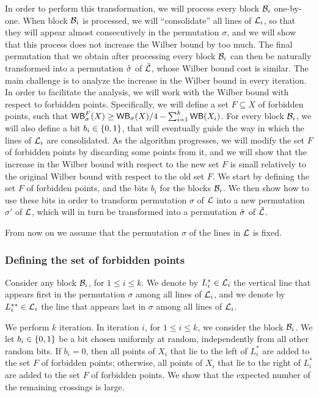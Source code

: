 \documentclass[11pt]{article}
\numberwithin{equation}{section}
\theoremstyle{definition}
\theoremstyle{plain}
\begin{document}
In order to perform this transformation, we will process every block ${\mathcal{B}}_i$ one-by-one. When block ${\mathcal{B}}_i$ is processed, we will ``consolidate'' all lines of ${\mathcal L}_i$, so that they will appear almost consecutively in the permutation $\sigma$, and we will show that this process does not increase the Wilber bound by too much. The final permutation that we obtain after processing every block ${\mathcal{B}}_i$ can then be naturally transformed into a permutation $\tilde{\sigma}$ of $\tilde{\mathcal{L}}$, whose Wilber bound cost is similar. The main challenge is to analyze the increase in the Wilber bound in every iteration. In order to facilitate the analysis, we will work with the Wilber bound with respect to forbidden points. Specifically, we will define a set $F\subseteq X$ of forbidden points, such that $\mathsf{WB}_{\sigma}^F(X)\geq \mathsf{WB}_{\sigma}(X)/4-\sum_{i=1}^k\mathsf{WB}(X_i)$. For every block ${\mathcal{B}}_i$, we will also define a bit $b_i\in \left\{ 0,1 \right\}$, that will eventually guide the way in which the lines of ${\mathcal L}_i$ are consolidated. As the algorithm progresses, we will modify the set $F$ of forbidden points by discarding some points from it, and we will show that the increase in the Wilber bound with respect to the new set $F$ is small relatively to the original Wilber bound with respect to the old set $F$. We start by defining the set $F$ of forbidden points, and the bits $b_i$ for the blocks ${\mathcal{B}}_i$. We then show how to use these bits in order to transform permutation $\sigma$ of ${\mathcal L}$ into a new permutation $\sigma'$ of ${\mathcal L}$, which will in turn be transformed into a permutation $\tilde{\sigma}$ of $\tilde{\mathcal{L}}$.

From now on we assume that the permutation $\sigma$ of the lines in ${\mathcal L}$ is fixed.

%
%
%
%
\subsubsection{Defining the set  of forbidden points}
%
%
%
%
Consider any block ${\mathcal{B}}_i$, for $1\leq i\leq k$. We denote by $L^*_i\in {\mathcal L}_i$ the vertical line that appears first in the permutation $\sigma$ among all lines of ${\mathcal L}_i$, and we denote by $L^{**}_i\in {\mathcal L}_i$ the line that appears last in $\sigma$ among all lines of ${\mathcal L}_i$. 

We perform $k$ iteration. In iteration $i$, for $1\leq i\leq k$, we consider the block ${\mathcal{B}}_i$. We let $b_i\in \left\{ 0,1 \right\}$ be a bit chosen uniformly at random, independently from all other random bits. If $b_i=0$, then all points of $X_i$ that lie to the left of $L^*_i$ are added to the set $F$ of forbidden points; otherwise, all points of $X_i$ that lie to the right of $L^*_i$ are added to the set $F$ of forbidden points. We show that the expected number of the remaining crossings is large.
\end{document}

